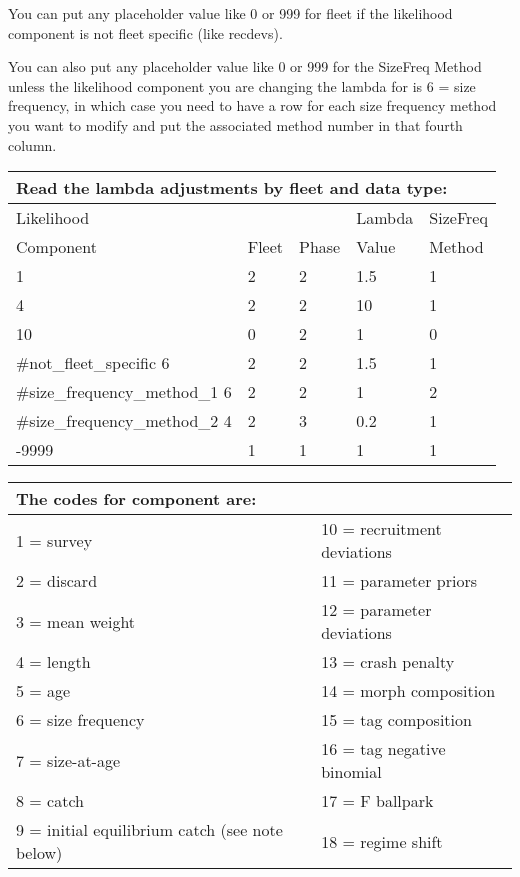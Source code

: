 You can put any placeholder value like 0 or 999 for fleet if the likelihood component is not fleet specific (like recdevs).

You can also put any placeholder value like 0 or 999 for the SizeFreq Method unless the likelihood component you are changing the lambda for is 6 = size frequency, in which case you need to have a row for each size frequency method you want to modify and put the associated method number in that fourth column.

\begin{longtable}{p{3cm} p{3cm} p{2cm} p{3cm} p{3cm}}

	\multicolumn{5}{l}{Read the lambda adjustments by fleet and data type:} \\
	\hline
	Likelihood &       &       & Lambda & SizeFreq \Tstrut\\
	Component  & Fleet & Phase & Value  & Method \Bstrut\\
	\hline
	1 & 2 & 2 & 1.5 & 1 \Tstrut\\
	4 & 2 & 2 & 10 & 1 \\
	10 & 0 & 2 & 1 & 0 \\ \#not\_fleet\_specific
	6 & 2 & 2 & 1.5 & 1 \\ \#size\_frequency\_method\_1
	6 & 2 & 2 & 1 & 2 \\ \#size\_frequency\_method\_2
	4 & 2 & 3 & 0.2 & 1 \\
	-9999 & 1 & 1 & 1 & 1 \Bstrut\\
	\hline
\end{longtable}


\begin{center}
	\begin{longtable}{p{7.5cm} p{7.5cm}}
		\multicolumn{2}{l}{The codes for component are:}\\
		\hline
		1 = survey  				   & 10 = recruitment deviations \Tstrut\\	
		2 = discard 				   & 11 = parameter priors \\		
		3 = mean weight 			   & 12 = parameter deviations \\	
		4 = length 					   & 13 = crash penalty \\		
		5 = age 					   & 14 = morph composition \\
		6 = size frequency  		   & 15 = tag composition \\		
		7 = size-at-age 			   & 16 = tag negative binomial \\
		8 = catch 					   & 17 = F ballpark \\		
		9 = initial equilibrium catch (see note below) & 18 = regime shift \Bstrut\\
		\hline
	\end{longtable}
\end{center}


